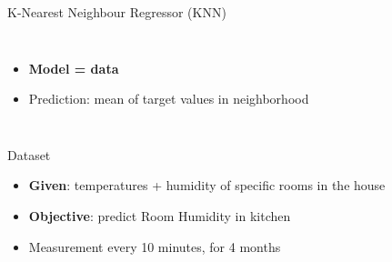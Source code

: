 \documentclass[9.5pt]{beamer}
\begin{document}
    \begin{frame}{K-Nearest Neighbour Regressor (KNN)}
        \begin{columns}[onlytextwidth]
            \begin{itemize}
                \item \textbf{Model = data}
                \item Prediction: mean of target values in neighborhood
            \end{itemize}
            \begin{figure}
                \centering
            \end{figure}
        \end{columns}
    \end{frame}

    \begin{frame}{Dataset}
        \begin{itemize}
            \item \textbf{Given}: temperatures + humidity of specific rooms in the house
            \item \textbf{Objective}: predict Room Humidity in kitchen
            \item Measurement every 10 minutes, for 4 months
        \end{itemize}
        \begin{figure}
            \centering
        \end{figure}
    \end{frame}
\end{document}
